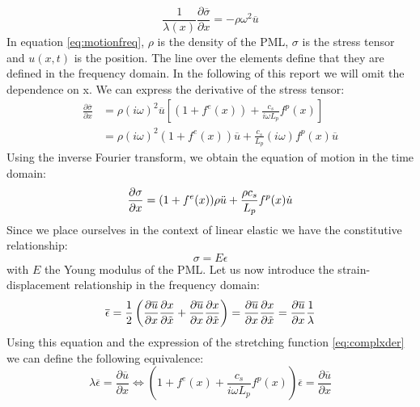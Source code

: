\begin{equation}
    \frac{1}{\lambda(x)} \frac{\partial \overline{\sigma}}{\partial x} = -\rho \omega^2\overline{u}
    \label{eq:motionfreq}
\end{equation}
In equation \ref{eq:motionfreq}, $\rho$ is the density of the PML, $\sigma$ is the stress tensor and $u(x,t)$ is the position. The line over the elements define that they are defined in the frequency domain. In the following of this report we will omit the dependence on x. We can express the derivative of the stress tensor:
\begin{equation}
    \begin{aligned}
        \frac{\partial \overline{\sigma}}{\partial x} &= \rho (i\omega)^2 \overline{u}\left[ (1+f^e(x))+\frac{c_s}{i\omega L_p}f^p(x) \right]\\
        &= \rho (i \omega)^2 (1+f^e(x))\overline{u}+\frac{c_s}{L_p} (i\omega) f^p(x) \overline{u}
    \end{aligned}
    \label{eq:constitutive}
\end{equation}
Using the inverse Fourier transform, we obtain the equation of motion in the time domain:
\begin{equation}
     \frac{\partial \sigma}{\partial x} = (1+f^e(x))\rho \Ddot{u} + \frac{\rho c_s}{L_p} f^p(x) \Dot{u}
     \label{eq:constitutive_time}
\end{equation}
Since we place ourselves in the context of linear elastic we have the constitutive relationship:
\begin{equation}
    \sigma = E \epsilon
    \label{eq:constitutive2}
\end{equation}
with $E$ the Young modulus of the PML. Let us now introduce the strain-displacement relationship in the frequency domain:
\begin{equation}
    \overline{\epsilon} = \frac{1}{2} \left( \frac{\partial \overline{u}}{\partial x} \frac{\partial x}{\partial \Tilde{x}} +  \frac{\partial \overline{u}}{\partial x} \frac{\partial x}{\partial \Tilde{x}} \right) =  \frac{\partial \overline{u}}{\partial x} \frac{\partial x}{\partial \Tilde{x}} =  \frac{\partial \overline{u}}{\partial x} \frac{1}{\lambda}
\end{equation}
Using this equation and the expression of the stretching function \ref{eq:complxder} we can define the following equivalence:
\begin{equation}
    \lambda \overline{\epsilon} = \frac{\partial \overline{u}}{\partial x} \iff \left( 1+f^e(x)+\frac{c_s}{i \omega L_p} f^p(x) \right)\overline{\epsilon} = \frac{\partial \overline{u}}{\partial x}
    \label{eq:derivpos}
\end{equation}
